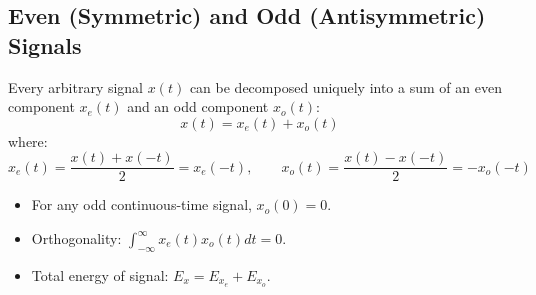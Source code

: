 \documentclass[12pt,a4paper]{article}
\begin{document}
\subsection{Even (Symmetric) and Odd (Antisymmetric) Signals}
Every arbitrary signal $x(t)$ can be decomposed uniquely into a sum of an even component $x_e(t)$ and an odd component $x_o(t)$:
\begin{equation}
  x(t) = x_e(t) + x_o(t)
\end{equation}
where:
\begin{equation}
  x_e(t) = \frac{x(t) + x(-t)}{2} = x_e(-t), \qquad x_o(t) = \frac{x(t) - x(-t)}{2} = -x_o(-t)
\end{equation}
\begin{itemize}[leftmargin=*, itemsep=3pt]
  \item For any odd continuous-time signal, $x_o(0) = 0$.
  \item Orthogonality: $\int_{-\infty}^{\infty} x_e(t) x_o(t) dt = 0$.
  \item Total energy of signal: $E_x = E_{x_e} + E_{x_o}$.
\end{itemize}
\end{document}
